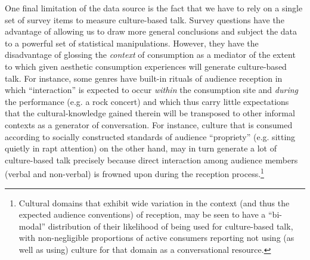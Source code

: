 One final limitation of the data source is the fact that we have to rely on a single set of survey items to measure culture-based talk.  Survey questions have the advantage of allowing us to draw more general conclusions and subject the data to a powerful set of statistical manipulations.  However, they have the disadvantage of glossing the \emph{context} of consumption as a mediator of the extent to which given aesthetic consumption experiences will generate culture-based talk. For instance, some genres have built-in rituals of audience reception in which ``interaction'' is expected to occur \emph{within} the consumption site and \emph{during} the performance (e.g. a rock concert) and which thus carry little expectations that the cultural-knowledge gained therein will be transposed to other informal contexts as a generator of conversation.  For instance, culture that is consumed according to socially constructed standards of audience ``propriety'' (e.g. sitting quietly in rapt attention) on the other hand, may in turn generate a lot of culture-based talk precisely because direct interaction among audience members (verbal and non-verbal) is frowned upon during the reception process.\footnote{Cultural domains that exhibit wide variation in the context (and thus the expected audience conventions) of reception, may be seen to have a ``bi-modal'' distribution of their likelihood of being used for culture-based talk, with non-negligible proportions of active consumers reporting not using (as well as using) culture for that domain as a conversational resource. }  